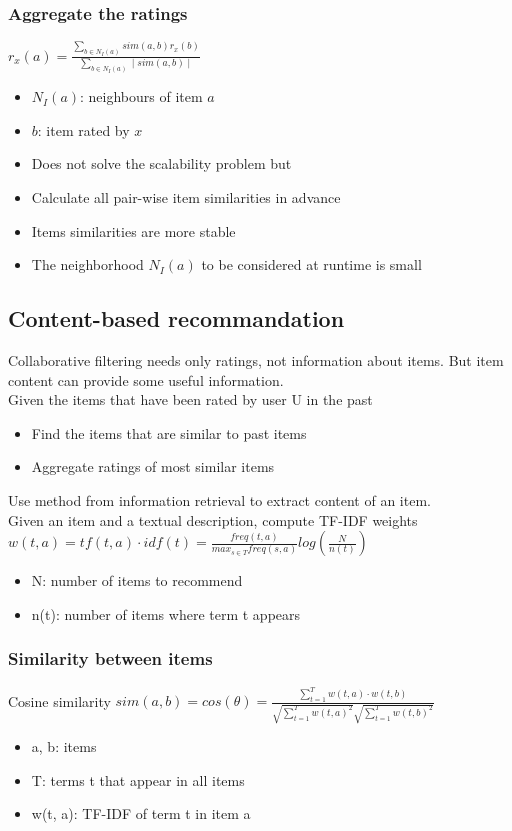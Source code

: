\subsubsection{Aggregate the ratings}
$ r_x(a) = \frac{\sum_{b \in N_I(a)} sim(a, b) r_x(b)}{\sum_{b \in
    N_I(a)} \mid sim(a, b) \mid}$
\begin{itemize}
\item $ N_I(a) $: neighbours of item $ a $
\item $ b $: item rated by $ x $
\end{itemize}

\begin{itemize}
\item Does not solve the scalability problem but
\item Calculate all pair-wise item similarities in advance
\item Items similarities are more stable
\item The neighborhood $ N_I(a) $ to be considered at runtime is small
\end{itemize}

\subsection{Content-based recommandation}
Collaborative filtering needs only ratings, not information about
items. But item content can provide some useful information. \\
Given the items that have been rated by user U in the past
\begin{itemize}
\item Find the items that are similar to past items
\item Aggregate ratings of most similar items
\end{itemize}

Use method from information retrieval to extract content of an
item. \\
Given an item and a textual description, compute TF-IDF weights \\
$ w(t,a) = tf(t, a) \cdot idf(t) = \frac{freq(t,a)}{max_{s \in T}
  freq(s, a)} log(\frac{N}{n(t)})$
\begin{itemize}
\item N: number of items to recommend
\item n(t): number of items where term t appears
\end{itemize}

\subsubsection{Similarity between items}
Cosine similarity
$ sim(a,b) = cos(\theta) = \frac{\sum_{t = 1}^T w(t,a) \cdot
  w(t,b)}{\sqrt{\sum_{t = 1}^T w(t,a)^2} \sqrt{\sum_{t=1}^T w(t,b)^2}}
$
\begin{itemize}
\item a, b: items
\item T: terms t that appear in all items
\item w(t, a): TF-IDF of term t in item a
\end{itemize}

